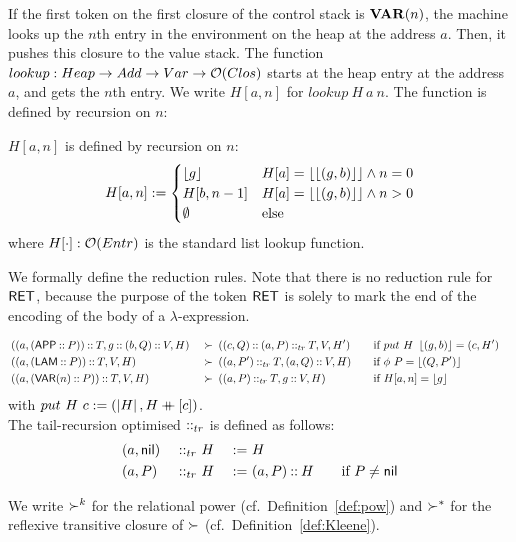 If the first token on the first closure of the control stack is $\mathsf{\mathbf{VAR}}(n)$, the machine looks up the
$n$th entry in the environment on the heap at the address $a$.  Then, it pushes this closure to the value stack.  The function $lookup : Heap \rightarrow Add
\rightarrow Var \rightarrow \mathcal{O}(Clos)$ starts at the heap entry at the address $a$, and gets the $n$th entry. We write $H[a,n]$ for
$lookup~H~a~n$.  The function is defined by recursion on $n$:
\begin{definition}[$lookup$]
  \label{def:lookup}
  $H[a,n]$ is defined by recursion on $n$:
  \[
    H[a,n] :=
    \begin{cases}
      \left\lfloor {g} \right\rfloor & H[a]=\left\lfloor {\left\lfloor {(g,b)} \right\rfloor} \right\rfloor \land n=0 \\
      H[b,n-1] & H[a]=\left\lfloor {\left\lfloor {(g,b)} \right\rfloor} \right\rfloor \land n>0 \\
      \emptyset & \text{else}
    \end{cases}
  \]
  where $H[\cdot] : \mathcal{O}(Entr)$ is the standard list lookup function.
\end{definition}



We formally define the reduction rules.  Note that there is no reduction rule for $\mathsf{RET}$, because the purpose of the token $\mathsf{RET}$ is solely to
mark the end of the encoding of the body of a $\lambda$-expression.
\begin{definition}
  {\small
    \begin{alignat*}{4}
      & \left((a, (\mathsf{APP} \mathbin{::} P)) \mathbin{::} T, g \mathbin{::} (b, Q) \mathbin{::} V, H\right) &~\succ~& \left((c, Q) \mathbin{::} (a,P) \mathbin{::}_{tr} T, V, H'\right)
      \quad&& \text{if $put~H~\left\lfloor {(g,b)} \right\rfloor = (c,H')$} \\
      & \left((a, (\mathsf{LAM} \mathbin{::} P)) \mathbin{::} T, V, H\right)                      &~\succ~& \left((a, P') \mathbin{::}_{tr} T, (a,Q) \mathbin{::} V, H\right)
      \quad&& \text{if $\phi~P = \left\lfloor {(Q, P')} \right\rfloor$} & \\
      & \left((a, (\mathsf{VAR}(n) \mathbin{::} P)) \mathbin{::} T, V, H\right)                   &~\succ~& \left((a, P) \mathbin{::}_{tr} T, g \mathbin{::} V, H\right)
      \quad&& \text{if $H[a,n]=\left\lfloor {g} \right\rfloor$} &
    \end{alignat*}
  }
  with $put~H~c := (\left| H \right|, H \mathbin{+\mkern-10mu+} [c]) $.\\
  The tail-recursion optimised $\mathbin{::}_{tr}$ is defined as follows:
  \begin{alignat*}{3}
    & (a, \mathsf{nil}) &~\mathbin{::}_{tr}~& H &~:=~& H \\
    & (a, P   ) &~\mathbin{::}_{tr}~& H &~:=~& (a, P) \mathbin{::} H \qquad\text{if $P \neq \mathsf{nil}$}
  \end{alignat*}

  We write $\succ^k$ for the relational power (cf.\ Definition~\ref{def:pow}) and $\succ^*$ for the reflexive transitive closure of $\succ$ (cf.\
  Definition~\ref{def:Kleene}).
\end{definition}

